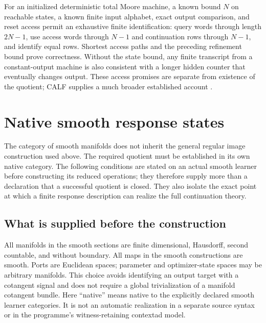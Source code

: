 \documentclass[11pt]{article}
\theoremstyle{definition}
\theoremstyle{remark}\newtheorem{remark}[theorem]{Remark}
\begin{document}
For an initialized deterministic total Moore machine, a known bound $N$
on reachable states, a known finite input alphabet, exact output comparison,
and reset access permit an exhaustive finite
identification: query words through length $2N-1$, use access words through
$N-1$ and continuation rows through $N-1$, and identify equal rows.
Shortest access paths and the preceding refinement bound prove correctness.
Without the state bound, any finite transcript from a constant-output machine
is also consistent with a longer hidden counter that eventually changes
output. These access promises are separate from existence of the quotient;
CALF supplies a much broader established account \cite{calf}.


\section{Native smooth response states}
\label{sec:smooth}
The category of smooth manifolds does not inherit the general regular image
construction used above. The required quotient must be established in its
own native category. The following conditions are stated on an actual
smooth learner before constructing its reduced operations; they therefore
supply more than a declaration that a successful quotient is closed.
They also isolate the exact point at which a finite response description
can realize the full continuation theory.

\subsection{What is supplied before the construction}
All manifolds in the smooth sections are finite dimensional, Hausdorff, second
countable, and without boundary. All maps in the smooth constructions are
smooth. Ports are Euclidean
spaces; parameter and optimizer-state spaces may be arbitrary manifolds.
This choice avoids identifying an output target with a cotangent signal and
does not require a global trivialization of a manifold cotangent bundle.
Here ``native'' means native to the explicitly declared smooth learner
categories. It is not an automatic realization in a separate source syntax
or in the programme's witness-retaining contextad model.
\end{document}
